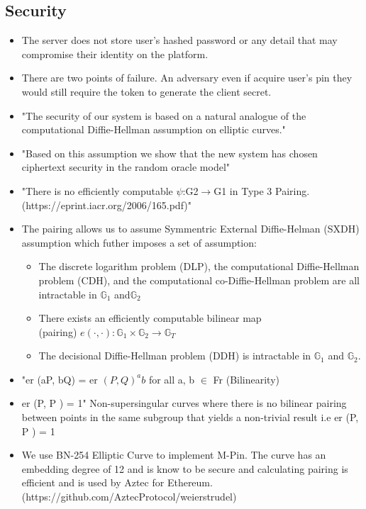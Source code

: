 \documentclass[]{article}   %
\begin{document}
\subsection*{Security}
\begin{itemize}
    \item The server does not store user's hashed password or any detail that may compromise their identity on the platform. 
    \item There are two points of failure. An adversary even if acquire user's pin they would still require the token to generate the client secret. 
    \item  "The security of our system is based on a natural analogue
    of the computational Diffie-Hellman assumption on elliptic curves."
    \item "Based on this assumption we show that the new system has chosen ciphertext security in the random oracle model"
    \item "There is no efficiently computable $\psi$:G2$\rightarrow$G1 in Type 3 Pairing. \\
    (https://eprint.iacr.org/2006/165.pdf)"

    \item The pairing allows us to assume Symmentric External Diffie-Helman (SXDH) assumption which futher imposes a set of assumption:
    \begin{itemize}
        \item The discrete logarithm problem (DLP), the computational Diffie-Hellman problem (CDH), and the computational co-Diffie-Hellman problem are all intractable in ${\displaystyle {\mathbb {G} }_{1}}$ and$ {\displaystyle {\mathbb {G} }_{2}} $
        \item There exists an efficiently computable bilinear map  \\(pairing) ${\displaystyle e(\cdot ,\cdot ):{\mathbb {G} }_{1}\times {\mathbb {G} }_{2}\rightarrow {\mathbb {G} }_{T}} $
        \item The decisional Diffie-Hellman problem (DDH) is intractable in
        ${\displaystyle {\mathbb {G} }_{1}}$ and ${\mathbb {G} }_{2}.$
    \end{itemize}

    \item "er (aP, bQ) = er $(P, Q)^ab$ for all a, b $\in$ Fr (Bilinearity)
    \item er (P, P ) = 1" Non-supersingular curves where there is no bilinear pairing between points in the same subgroup that yields a non-trivial result i.e er (P, P ) = 1 
    \item We use BN-254 Elliptic Curve to implement M-Pin. The curve has an embedding degree of 12 and is know to be secure and calculating pairing is efficient and is used by Aztec for Ethereum.\\
    (https://github.com/AztecProtocol/weierstrudel)




\end{itemize}
\end{document}
